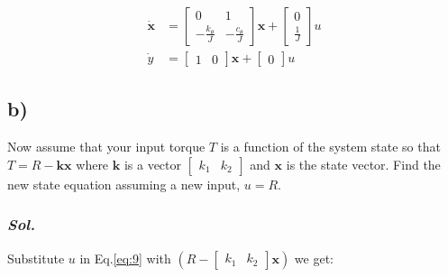 \begin{equation} \label{eq:9}
    \begin{aligned} 
        \dot{\textbf{x}} &= 
        \begin{bmatrix}
            0 & 1 \\
            -\frac{k_{\theta}}{J} & -\frac{c_{\theta}}{J}
        \end{bmatrix}
        \textbf{x} + 
        \begin{bmatrix}
            0\\
            \frac{1}{J}
        \end{bmatrix}
        u
        \\
        \dot{y} &=
        \begin{bmatrix}
            1 & 0
        \end{bmatrix}
        \textbf{x} + 
        \begin{bmatrix}
            0
        \end{bmatrix}
        u
    \end{aligned}
\end{equation}



\subsection{b)}
Now assume that your input torque $T$ is a function of the system state so that
$T = R - \textbf{k}\textbf{x}$ where $\textbf{k}$ is a vector $\begin{bmatrix}k_1 & k_2\end{bmatrix}$ and $\textbf{x}$ is the state vector. Find the new state equation assuming a new input, $u = R$.

\subsubsection{\textit{ Sol. }}

Substitute $u$ in Eq.\ref{eq:9} with 
$\left(R - \begin{bmatrix} k_1 & k_2 \end{bmatrix} \textbf{x}\right)$ we get:

